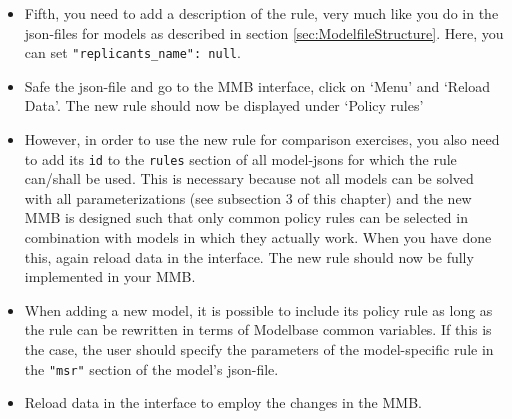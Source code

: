 \begin{itemize}
\item Fifth, you need to add a description of the rule, very much like you do in the json-files for models as described in section \ref{sec:ModelfileStructure}. Here, you can set \texttt{"replicants\_name": null}.
\item Safe the json-file and go to the MMB interface, click on `Menu' and `Reload Data'. The new rule should now be displayed under `Policy rules'
\item However, in order to use the new rule for comparison exercises, you also need to add its \texttt{id} to the \texttt{rules} section of all model-jsons for which the rule can/shall be used. This is necessary because not all models can be solved with all parameterizations (see subsection 3 of this chapter) and the new MMB is designed such that only common policy rules can be selected in combination with models in which they actually work. When you have done this, again reload data in the interface. The new rule should now be fully implemented in your MMB.


\end{itemize}



\begin{itemize}
  \item When adding a new model, it is possible to include its policy rule as long as the rule can be rewritten in terms of Modelbase common variables. If this is the case, the user should specify the parameters of the model-specific rule in the \texttt{"msr"} section of the model's json-file.
\item Reload data in the interface to employ the changes in the MMB.
\end{itemize}

